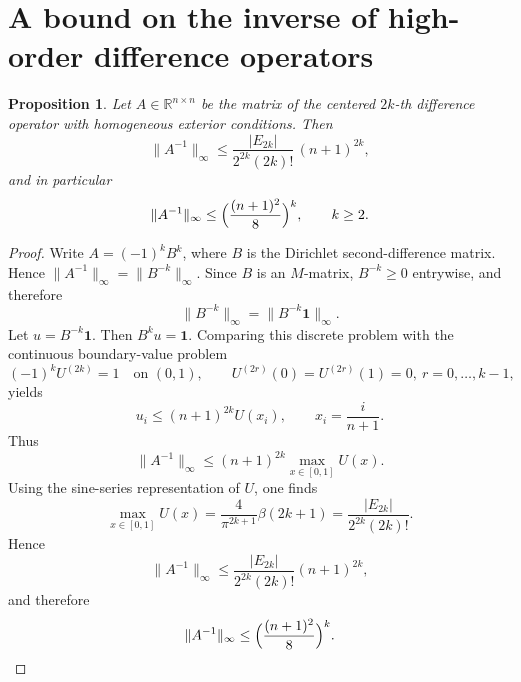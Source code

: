 \documentclass[11pt,oneside,reqno]{amsart}
\theoremstyle{plain}
\newtheorem{proposition}[theorem]{Proposition}
\numberwithin{equation}{section}
\begin{document}
\medskip

\appendix


\section{A bound on the inverse of high-order difference operators}

\begin{proposition}
Let $A\in\mathbb R^{n\times n}$ be the matrix
of the centered $2k$-th difference operator
with homogeneous exterior conditions.
Then
\[
\|A^{-1}\|_\infty
\le
\frac{|E_{2k}|}{2^{2k}(2k)!}\,(n+1)^{2k},
\]
and in particular
\[
\|A^{-1}\|_\infty
\le
\Bigl(\frac{(n+1)^2}{8}\Bigr)^k,
\qquad k\ge2.
\]
\end{proposition}

\begin{proof}
Write $A=(-1)^kB^k$, where $B$ is the Dirichlet second-difference matrix.
Hence $\|A^{-1}\|_\infty=\|B^{-k}\|_\infty$.
Since $B$ is an $M$-matrix, $B^{-k}\ge0$ entrywise, and therefore
\[
\|B^{-k}\|_\infty=\|B^{-k}\mathbf1\|_\infty.
\]
Let $u=B^{-k}\mathbf1$.
Then $B^ku=\mathbf1$.
Comparing this discrete problem with the continuous boundary-value problem
\[
(-1)^kU^{(2k)}=1\quad\text{on }(0,1),
\qquad
U^{(2r)}(0)=U^{(2r)}(1)=0,\ r=0,\dots,k-1,
\]
yields
\[
u_i\le (n+1)^{2k}U(x_i),\qquad x_i=\frac{i}{n+1}.
\]
Thus
\[
\|A^{-1}\|_\infty
\le
(n+1)^{2k}\max_{x\in[0,1]}U(x).
\]
Using the sine-series representation of $U$, one finds
\[
\max_{x\in[0,1]}U(x)
=
\frac{4}{\pi^{2k+1}}\beta(2k+1)
=
\frac{|E_{2k}|}{2^{2k}(2k)!}.
\]
Hence
\[
\|A^{-1}\|_\infty
\le
\frac{|E_{2k}|}{2^{2k}(2k)!}(n+1)^{2k},
\]
and therefore
\[
\|A^{-1}\|_\infty
\le
\Bigl(\frac{(n+1)^2}{8}\Bigr)^k.
\]
\end{proof}


\bigskip
\end{document}
